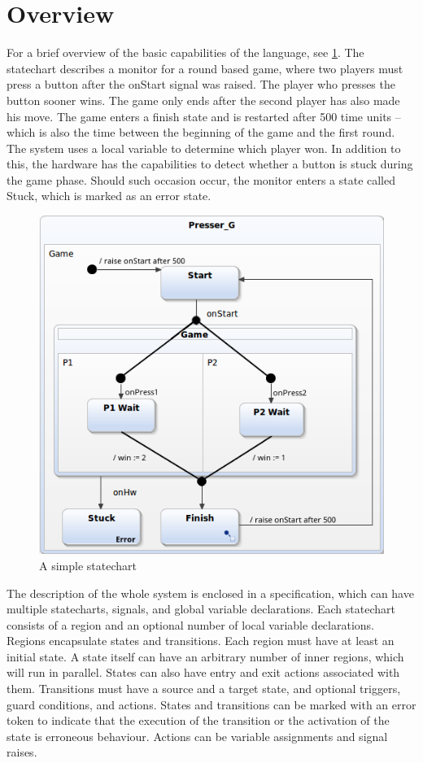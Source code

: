 \section{Overview}
For a brief overview of the basic capabilities of the language, see \cref{fig:verif}. The statechart describes a monitor for a round based game, where two players must press a button after the onStart signal was raised. The player who presses the button sooner wins. The game only ends after the second player has also made his move. The game enters a finish state and is restarted after 500 time units -- which is also the time between the beginning of the game and the first round. The system uses a local variable to determine which player won. In addition to this, the hardware has the capabilities to detect whether a button is stuck during the game phase. Should such occasion occur, the monitor enters a state called Stuck, which is marked as an error state.
\begin{figure}[H]
	\centering
	\includegraphics[width=0.65\linewidth]{include/figures/chapter_4/stcex}
	\caption{A simple statechart}
	\label{fig:verif}
\end{figure}

The description of the whole system is enclosed in a specification, which can have multiple statecharts, signals, and global variable declarations. Each statechart consists of a region and an optional number of local variable declarations. Regions encapsulate states and transitions. Each region must have at least an initial state. A state itself can have an arbitrary number of inner regions, which will run in parallel. States can also have entry and exit actions associated with them. Transitions must have a source and a target state, and optional triggers, guard conditions, and actions. States and transitions can be marked with an error token to indicate that the execution of the transition or the activation of the state is erroneous behaviour. Actions can be variable assignments and signal raises.

